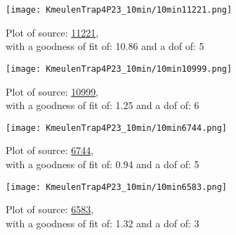 \documentclass{article}
\begin{document}
\begin{figure}[H]
    \centering
    \begin{minipage}{.5\textwidth}
        \centering
        \texttt{[image: KmeulenTrap4P23\_10min/10min11221.png]}
        \captionsetup{labelformat=empty}
        \caption{Plot of source: \href{http://banana.transientskp.org/r4/vlo_KmeulenTrap4P23/runningcatalog/11221}{11221},\\with a goodness of fit of: 10.86 and a dof of: 5}
        \addtocounter{figure}{-1}
        \label{KmeulenTrap4P23:10min:11221:plot}
    \end{minipage}%
    \begin{minipage}{0.5\textwidth}
        \centering

        \texttt{[image: KmeulenTrap4P23\_10min/10min10999.png]}
        \captionsetup{labelformat=empty}
        \caption{Plot of source: \href{http://banana.transientskp.org/r4/vlo_KmeulenTrap4P23/runningcatalog/10999}{10999},\\with a goodness of fit of: 1.25 and a dof of: 6}
    \addtocounter{figure}{-1}
    \label{KmeulenTrap4P23:10min:10999:plot}
    \end{minipage}
\end{figure}
\begin{figure}[H]
    \centering
    \begin{minipage}{.5\textwidth}
        \centering
        \texttt{[image: KmeulenTrap4P23\_10min/10min6744.png]}
        \captionsetup{labelformat=empty}
        \caption{Plot of source: \href{http://banana.transientskp.org/r4/vlo_KmeulenTrap4P23/runningcatalog/6744}{6744},\\with a goodness of fit of: 0.94 and a dof of: 5}
        \addtocounter{figure}{-1}
        \label{KmeulenTrap4P23:10min:6744:plot}
    \end{minipage}%
    \begin{minipage}{0.5\textwidth}
        \centering

        \texttt{[image: KmeulenTrap4P23\_10min/10min6583.png]}
        \captionsetup{labelformat=empty}
        \caption{Plot of source: \href{http://banana.transientskp.org/r4/vlo_KmeulenTrap4P23/runningcatalog/6583}{6583},\\with a goodness of fit of: 1.32 and a dof of: 3}
    \addtocounter{figure}{-1}
    \label{KmeulenTrap4P23:10min:6583:plot}
    \end{minipage}
\end{figure}
\newpage
\end{document}
